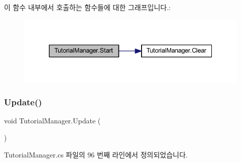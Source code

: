\begin{DoxyCode}{0}

\end{DoxyCode}
이 함수 내부에서 호출하는 함수들에 대한 그래프입니다.\+:\nopagebreak
\begin{figure}[H]
\begin{center}
\leavevmode
\includegraphics[width=337pt]{d6/d14/class_tutorial_manager_a51ab9e8dbee6bbd7a9e59a1e86c62c72_cgraph}
\end{center}
\end{figure}
\mbox{\label{class_tutorial_manager_a1afb4727c17e0b78186a92ce48bebace}} 
\subsubsection{\texorpdfstring{Update()}{Update()}}
{\footnotesize\ttfamily void Tutorial\+Manager.\+Update (\begin{DoxyParamCaption}{ }\end{DoxyParamCaption})}



Tutorial\+Manager.\+cs 파일의 96 번째 라인에서 정의되었습니다.



